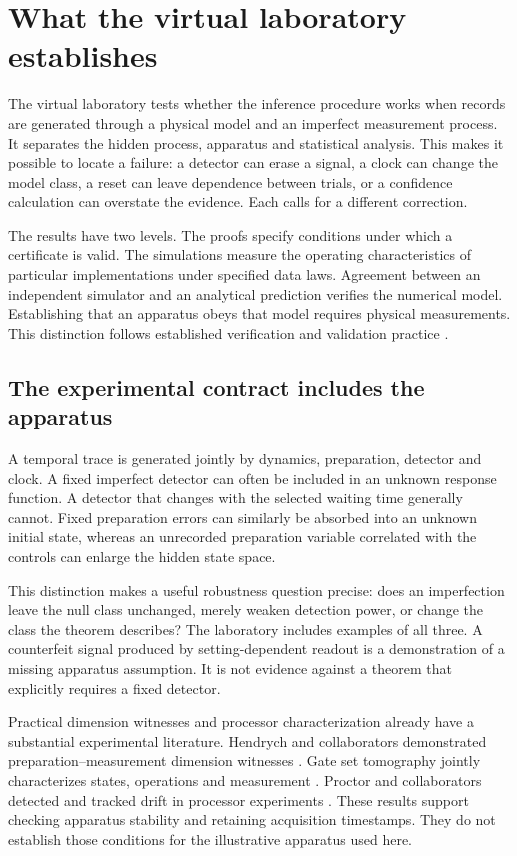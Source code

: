 \chapter{What the virtual laboratory establishes}
\label{ch:vl-positioning}

The virtual laboratory tests whether the inference procedure works when records
are generated through a physical model and an imperfect measurement process.
It separates the hidden process, apparatus and statistical analysis. This makes
it possible to locate a failure: a detector can erase a signal, a clock can
change the model class, a reset can leave dependence between trials, or a
confidence calculation can overstate the evidence. Each calls for a different
correction.

The results have two levels. The proofs specify conditions under which a
certificate is valid. The simulations measure the operating characteristics
of particular implementations under specified data laws. Agreement between an
independent simulator and an analytical prediction verifies the numerical
model. Establishing that an apparatus obeys that model requires physical
measurements. This distinction follows established verification and validation
practice \cite{vlOberkampf2002}.

\section{The experimental contract includes the apparatus}

A temporal trace is generated jointly by dynamics, preparation, detector and
clock. A fixed imperfect detector can often be included in an unknown response
function. A detector that changes with the selected waiting time generally
cannot. Fixed preparation errors can similarly be absorbed into an unknown
initial state, whereas an unrecorded preparation variable correlated with the
controls can enlarge the hidden state space.

This distinction makes a useful robustness question precise: does an
imperfection leave the null class unchanged, merely weaken detection power,
or change the class the theorem describes? The laboratory includes examples
of all three. A counterfeit signal produced by setting-dependent readout is
a demonstration of a missing apparatus assumption. It is not evidence against
a theorem that explicitly requires a fixed detector.

Practical dimension witnesses and processor characterization already have a
substantial experimental literature. Hendrych and collaborators demonstrated
preparation--measurement dimension witnesses \cite{vlHendrych2012}. Gate set
tomography jointly characterizes states, operations and measurement
\cite{vlNielsen2021}. Proctor and collaborators detected and tracked drift in
processor experiments \cite{vlProctor2020}. These results support checking
apparatus stability and retaining acquisition timestamps. They do not establish
those conditions for the illustrative apparatus used here.


